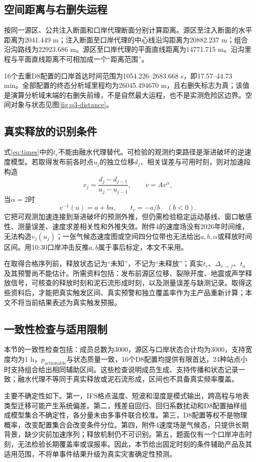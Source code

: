 
\subsection{空间距离与右删失运程}
按同一源区、公共注入断面和口岸代理断面分别计算距离。源区至注入断面的水平距离为2041.449 m；注入断面至口岸代理的中心线沿沟距离为20882.237 m；组合沿沟路线为22923.686 m。源区至口岸代理的平面直线距离为14771.715 m。沿沟里程与平面直线距离不可相加成一个“距离范围”。

16个去重D8配置的口岸首达时间范围为1054.226--2683.668 s，即17.57--44.73 min。全部配置的终态分析域里程均为26045.494670 m，且右删失标志为真；该值是演算分析域末端的右删失前缘，不是自然最大运程，也不是实测危险区边界。空间对象与状态见图\ref{fig:q3-distance}。


\subsection{真实释放的识别条件}
式\eqref{eq:times}中的$t_r$不能由融水代理替代。可检验的观测约束路径是渐进破坏的逆速度模型。若取得发布前各时点$u_j$的独立位移$d_j$、相关误差与可用时刻，则对加速段构造
\begin{equation}
v_j=\frac{d_j-d_{j-1}}{u_j-u_{j-1}},\qquad
\dot v=A v^\alpha,
\end{equation}
当$\alpha=2$时
\begin{equation}
v^{-1}(u)=a+bu,\qquad t_r=-a/b\quad(b<0).
\end{equation}
它把可观测加速连接到渐进破坏的预测外推，但仍需检验稳定运动基线、窗口敏感性、测量误差、速度求差相关性和外推失效。附件4的速度场没有2026年时间维，无法构造$v_j(u_j)$；一张气候态速度图或空间四分位带也无法给出$a,b,\alpha$或释放时间区间。用10:30口岸冲击反推$a,b$属于事后标定，本文不采用。

在取得合格序列前，释放状态记为“未知”，不记为“未释放”；真实$t_r$、$\Delta_{r\to f}$、$t_a$及其预警尚不能估计。所需资料包括：发布前源区位移、裂隙开度、地震或声学释放信号，可核查的释放时刻和泥石流形成时刻，以及测量误差与缺测记录。取得这些资料后，才能把真实触发区间、真实预警和独立覆盖率作为主产品重新计算；本文不将当前结果表述为真实触发预报。

\subsection{一致性检查与适用限制}
本节的一致性检查包括：成员总数为3000，源区与口岸状态合计均为3000，支持宽度均为1 h，$p_{\mathrm{actionable}}$与状态质量一致，16个D8配置均提供有限首达，24种站点小时支持组合给出相同辅助区间。这些检查说明成员生成、支持传播和状态记录一致；融水代理不等同于真实释放或泥石流形成，区间也不具备真实频率覆盖。

主要不确定性如下。第一，IFS格点温度、短波和湿度是模式输出，跨高程与地表类型迁移可能产生系统偏差。第二，残差自回归、回归系数扰动和D8配置抽样组成模型集合不确定性，各分量未由多事件联合校准。第三，D8配置等权不是物理概率，改变配置集合会改变条件分位。第四，附件4速度场是气候态，只提供长期背景，缺少灾前加速序列；释放机制仍不可识别。第五，题面仅有一个口岸冲击时刻，无法检验长期覆盖率或误报率。因此，本节给出固定时刻的条件辅助产品及其适用范围，不将单事件结果升级为真实灾害确定性预测。
